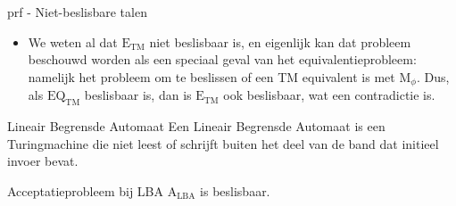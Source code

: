 \begin{prf}{prf - Niet-beslisbare talen}
\begin{itemize}
            We laten zien dat we voor elk paar $\langle \text{M}, s \rangle$ een TM $\text{M}_{\langle \text{M}, s \rangle}$ kunnen berekenen met de eigenschap dat $\text{L}_{\text{M}_{\langle \text{M}, s \rangle}}$ gelijk is aan de reguliere taal $\Sigma^*$ indien M $s$ accepteert, en gelijk is aan de niet-reguliere taal $\{ 0^n1^n \ | \ n \in \mathbb{N} \}$ indien M $s$ niet accepteert. Op deze $\langle \text{M}, s \rangle$ junnen we vervolgens een beslisser voor $\text{REGULAR}_{\text{TM}}$ toepassen om te beslissen of M $s$ accepteert. Dit leidt tot contradictie. Voor elk paar $\langle \text{M}, s \rangle$ doet $\text{M}_{\langle \text{M}, s \rangle}$ het volgende bij input w: het berekent of w van de vorm $0^n1^n$ is (gebruikmakend van de beslisser). Zo ja, dan stopt $\text{M}_{\langle \text{M}, s \rangle}$ met accept; zo niet, dan wordt M gesimuleerd op $s$; indien M eindigt, dan eindigt $\text{M}_{\langle \text{M}, s \rangle}$ in dezelfde eindtoestand als M. Stel dat $\text{REGULAR}_{\text{TM}}$ een beslisser R bezit. Construeer nu een beslisser B voor A$_{\text{TM}}$ als volgt: bij input $\langle \text{M}, s \rangle$, berekent B de code $\langle \text{M}_{\langle \text{M}, s \rangle} \rangle$ van $\text{M}_{\langle \text{M}, s \rangle}$ en voert R uit op deze code. Indien R accepteert, dan is $\text{L}_{\text{M}_{\langle \text{M}, s \rangle}} = \Sigma^*$, en dan eindigt B met accept; indien E reject, dan is $\text{L}_{\text{M}_{\langle \text{M}, s \rangle}} = \{ 0^n1^n \ | \ n \in \mathbb{N} \}$, en dan eindigt B met reject. Sinds een beslisser B voor $\text{A}_{\text{TM}}$ niet bestaat, kan $\text{REGULAR}_{\text{TM}}$ niet beslisbaar zijn.
        \item 
            We weten al dat $\text{E}_{\text{TM}}$ niet beslisbaar is, en eigenlijk kan dat probleem beschouwd worden als een speciaal geval van het equivalentieprobleem: namelijk het probleem om te beslissen of een TM equivalent is met M$_{\phi}$. Dus, als $\text{EQ}_{\text{TM}}$ beslisbaar is, dan is $\text{E}_{\text{TM}}$ ook beslisbaar, wat een contradictie is.
    \end{itemize}
\end{prf}

\begin{theo}{Lineair Begrensde Automaat}
    Een Lineair Begrensde Automaat is een Turingmachine die niet leest of schrijft buiten het deel van de band dat initieel invoer bevat.
\end{theo}

\begin{lem}{Acceptatieprobleem bij LBA}
    $\text{A}_{\text{LBA}}$ is beslisbaar.
\end{lem}

